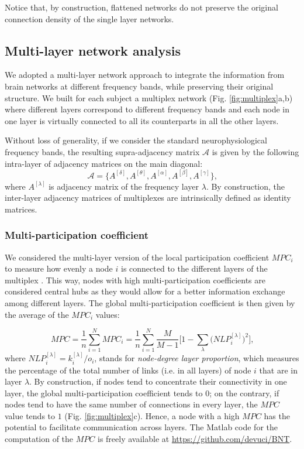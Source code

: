 Notice that, by construction, flattened networks do not preserve the original connection density of the single layer networks.

\subsection{Multi-layer network analysis} \label{subsec:multiplex_networks}
We adopted a multi-layer network approach to integrate the information from brain networks at different frequency bands, while preserving their original structure.
We built for each subject a multiplex network (Fig. \ref{fig:multiplex}a,b) where different layers correspond to different frequency bands and each node in one layer is virtually connected to all its counterparts in all the other layers.

Without loss of generality, if we consider the standard neurophysiological frequency bands, the resulting supra-adjacency matrix $\mathcal{A}$ is given by the following intra-layer of adjacency matrices on the main diagonal:
\begin{equation}
	\mathcal{A} = \{ A^{[\delta]}, A^{[\theta]}, A^{[\alpha]}, A^{[\beta]}, A^{[\gamma]} \}\text{,}
	\label{eq:supraadjacency}
\end{equation}
where $A^{[\lambda]}$ is adjacency matrix of the frequency layer $\lambda$. By construction, the inter-layer adjacency matrices of multiplexes are intrinsically defined as identity matrices.

\subsubsection{Multi-participation coefficient} \label{subsec:mpc}
We considered the multi-layer version of the local participation coefficient $MPC_i$ to measure how evenly a node $i$ is connected to the different layers of the multiplex \citep{battiston_structural_2014}.
This way, nodes with high multi-participation coefficients are considered central hubs as they would allow for a better information exchange among different layers.
The global multi-participation coefficient is then given by the average of the $MPC_i$ values:

\begin{equation}
	MPC = \frac{1}{n} \sum_{i=1}^{N} MPC_i
	= \frac{1}{n} \sum_{i=1}^{N} \frac{M}{M-1} \Bigg[ 1-\sum_{\lambda} \Bigg( NLP_i^{[\lambda]} \Bigg)^2 \Bigg] \text{,}
	\label{eq:mpc}
\end{equation}
where $NLP_i^{[\lambda]} = k_i^{[\lambda]} / o_i$, stands for \textit{node-degree layer proportion}, which measures the percentage of the total number of links (i.e. in all layers) of node $i$ that are in layer $\lambda$.
By construction, if nodes tend to concentrate their connectivity in one layer, the global multi-participation coefficient tends to $0$; on the contrary, if nodes tend to have the same number of connections in every layer, the $MPC$ value tends to  $1$ (Fig. \ref{fig:multiplex}c). Hence, a node with a high $MPC$ has the potential to facilitate communication across layers.
The Matlab code for the computation of the $MPC$ is freely available at \href{https://github.com/devuci/BNT}{https://github.com/devuci/BNT}.

